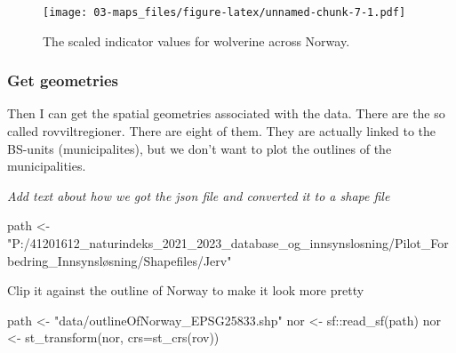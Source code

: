 \documentclass[
]{book}
\newenvironment{Shaded}{\begin{snugshade}}{\end{snugshade}}
\newcommand{\AttributeTok}[1]{\textcolor[rgb]{0.77,0.63,0.00}{#1}}
\newcommand{\CommentTok}[1]{\textcolor[rgb]{0.56,0.35,0.01}{\textit{#1}}}
\newcommand{\FunctionTok}[1]{\textcolor[rgb]{0.00,0.00,0.00}{#1}}
\newcommand{\NormalTok}[1]{#1}
\newcommand{\OtherTok}[1]{\textcolor[rgb]{0.56,0.35,0.01}{#1}}
\newcommand{\SpecialCharTok}[1]{\textcolor[rgb]{0.00,0.00,0.00}{#1}}
\newcommand{\StringTok}[1]{\textcolor[rgb]{0.31,0.60,0.02}{#1}}
\begin{document}
\begin{figure}
\centering
\texttt{[image: 03-maps\_files/figure-latex/unnamed-chunk-7-1.pdf]}
\caption{\label{fig:unnamed-chunk-7}The scaled indicator values for wolverine across Norway.}
\end{figure}

\hypertarget{get-geometries}{%
\subsubsection{Get geometries}\label{get-geometries}}

Then I can get the spatial geometries associated with the data. There are the so called rovviltregioner. There are eight of them. They are actually linked to the BS-units (municipalites), but we don't want to plot the outlines of the municipalities.

\emph{Add text about how we got the json file and converted it to a shape file}

\begin{Shaded}
\begin{Highlighting}[]
\NormalTok{path }\OtherTok{\textless{}{-}} \StringTok{"P:/41201612\_naturindeks\_2021\_2023\_database\_og\_innsynslosning/Pilot\_Forbedring\_Innsynsløsning/Shapefiles/Jerv"}
\end{Highlighting}
\end{Shaded}

\begin{Shaded}
\end{Shaded}

Clip it against the outline of Norway to make it look more pretty

\begin{Shaded}
\begin{Highlighting}[]
\NormalTok{path }\OtherTok{\textless{}{-}} \StringTok{"data/outlineOfNorway\_EPSG25833.shp"}
\NormalTok{nor }\OtherTok{\textless{}{-}}\NormalTok{ sf}\SpecialCharTok{::}\FunctionTok{read\_sf}\NormalTok{(path)}
\NormalTok{nor }\OtherTok{\textless{}{-}} \FunctionTok{st\_transform}\NormalTok{(nor, }\AttributeTok{crs=}\FunctionTok{st\_crs}\NormalTok{(rov))}
\end{Highlighting}
\end{Shaded}
\end{document}
